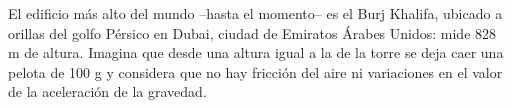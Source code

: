 El edificio más alto del mundo --hasta el momento-- es
el Burj Khalifa, ubicado a orillas del golfo Pérsico en Dubai,
ciudad de Emiratos Árabes Unidos: mide 828 m de altura.
Imagina que desde una altura igual a la de la torre se
deja caer una pelota de 100 g y considera que no hay
fricción del aire ni variaciones en el valor de la aceleración
de la gravedad.

\begin{parts}
    
    
    
    
    
    
\end{parts}
